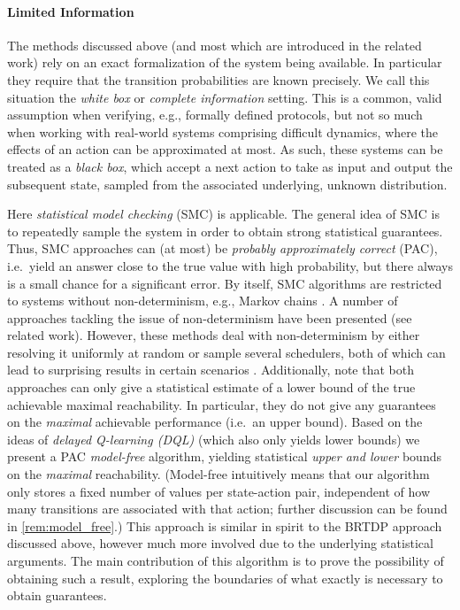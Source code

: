 \documentclass{theoretics}
\begin{document}
\paragraph{Limited Information}
The methods discussed above (and most which are introduced in the related work) rely on an exact formalization of the system being available.
In particular they require that the transition probabilities are known precisely.
We call this situation the \emph{white box} or \emph{complete information} setting.
This is a common, valid assumption when verifying, e.g., formally defined protocols, but not so much when working with real-world systems comprising difficult dynamics, where the effects of an action can be approximated at most.
As such, these systems can be treated as a \emph{black box}, which accept a next action to take as input and output the subsequent state, sampled from the associated underlying, unknown distribution.

Here \emph{statistical model checking} (SMC) \cite{DBLP:conf/cav/YounesS02,DBLP:conf/vmcai/HeraultLMP04} is applicable.
The general idea of SMC is to repeatedly sample the system in order to obtain strong statistical guarantees.
Thus, SMC approaches can (at most) be \emph{probably approximately correct} (PAC), i.e.\ yield an answer close to the true value with high probability, but there always is a small chance for a significant error.
By itself, SMC algorithms are restricted to systems without non-determinism, e.g., Markov chains \cite{DBLP:conf/cav/Younes05a,DBLP:conf/qest/SenVA05}.
A number of approaches tackling the issue of non-determinism have been presented (see related work).
However, these methods deal with non-determinism by either resolving it uniformly at random or sample several schedulers, both of which can lead to surprising results in certain scenarios \cite{DBLP:conf/isola/BohlenderBJKNN14}.
Additionally, note that both approaches can only give a statistical estimate of a lower bound of the true achievable maximal reachability.
In particular, they do not give any guarantees on the \emph{maximal} achievable performance (i.e.\ an upper bound). Based on the ideas of \emph{delayed Q-learning (DQL)} \cite{DBLP:conf/icml/StrehlLWLL06} (which also only yields lower bounds) we present a PAC \emph{model-free} algorithm, yielding statistical \emph{upper and lower} bounds on the \emph{maximal} reachability.
(Model-free intuitively means that our algorithm only stores a fixed number of values per state-action pair, independent of how many transitions are associated with that action; further discussion can be found in \cref{rem:model_free}.)
This approach is similar in spirit to the BRTDP approach discussed above, however much more involved due to the underlying statistical arguments.
The main contribution of this algorithm is to prove the possibility of obtaining such a result, exploring the boundaries of what exactly is necessary to obtain guarantees.
\end{document}
